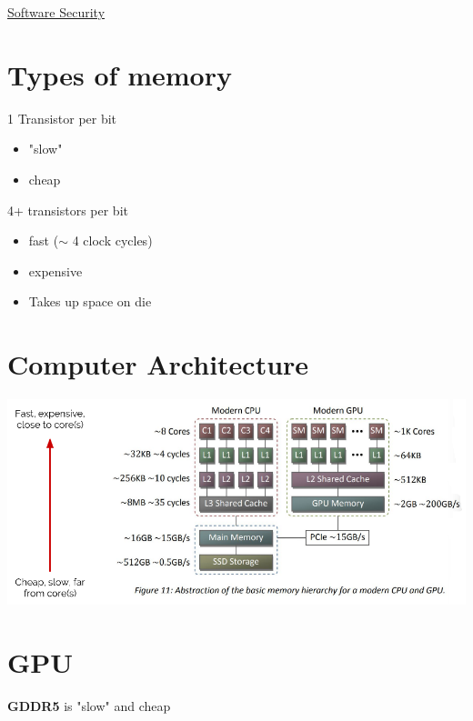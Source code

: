 \documentclass{article}[18pt]
\begin{document}
\begin{center}
\underline{\huge Software Security}
\end{center}
\section{Types of memory}
\begin{defin}[DRAM]
1 Transistor per bit
\begin{itemize}
	\item "slow"
	\item cheap
\end{itemize}
\end{defin}

\begin{defin}[SRAM]
	4+ transistors per bit
	\begin{itemize}
		\item fast ($\sim$ 4 clock cycles)
		\item expensive
		\item Takes up space on die
	\end{itemize}
\end{defin}
\section{Computer Architecture}
\begin{center}
	\includegraphics[width=0.7\linewidth]{"Computer Architecture"}
\end{center}
\section{GPU}
\textbf{GDDR5} is "slow" and cheap
\end{document}
